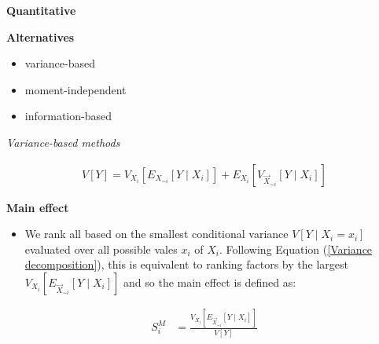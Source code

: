 \begin{frame}\begin{center}
		\LARGE\textbf{Quantitative}
\end{center}\end{frame}
\begin{frame}\textbf{Alternatives}\vspace{0.3cm}

\begin{itemize}\setlength\itemsep{1em}
  \item variance-based
  \item moment-independent
  \item information-based
\end{itemize}

\end{frame}
\begin{frame}\begin{center}
		\LARGE\textit{Variance-based methods}
\end{center}\end{frame}
\begin{frame}
	\begin{align}\label{Variance decomposition}
	V[Y] = V_{X_i}[E_{X_{\sim i}}[Y\mid X_i]] + E_{X_i}[V_{\vec{X}_{\sim i}}[Y\mid X_i]]
	\end{align}
\end{frame}
\begin{frame}\textbf{Main effect}\vspace{0.3cm}

\begin{itemize}\setlength\itemsep{1em}
\item We rank all based on the smallest conditional variance $V[Y \mid X_i = x_i]$ evaluated over all possible vales $x_i$ of $X_i$. Following Equation (\ref{Variance decomposition}), this is equivalent to ranking factors by the largest
$V_{X_i}[E_{\vec{X}_{\sim i}}[Y\mid X_i]]$ and so the main effect is defined as:
\end{itemize}

\begin{align*}
S^M_i & = \frac{V_{X_i}[E_{\vec{X}_{\sim i}}[Y\mid X_i]]}{V[Y]}
\end{align*}
\end{frame}

